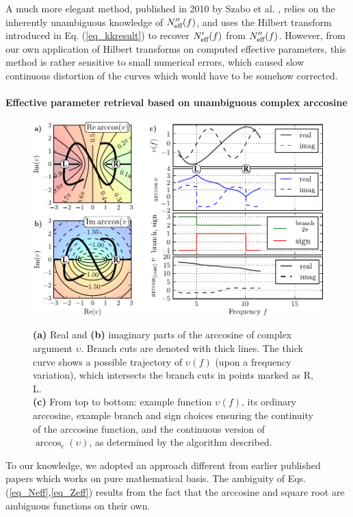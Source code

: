 A much more elegant method, published in 2010 by Szabo et al. \cite{szabo2010unique}, relies on the inherently unambiguous knowledge of $N_{\text{eff} }''(f)$, and uses the Hilbert transform introduced in Eq. (\ref{eq_kkresult}) to recover $N_{\text{eff} }'(f)$ from $N_{\text{eff} }''(f)$. 
However, from our own application of Hilbert transforms on computed effective parameters, this method is rather sensitive to small numerical errors, which caused slow continuous distortion of the curves which would have to be somehow corrected. 


\paragraph{Effective parameter retrieval based on unambiguous complex arccosine}
\begin{figure} \centering \caption{\textbf{(a)} Real and \textbf{(b)} imaginary parts of the arccosine of complex argument $\upsilon$. Branch cuts are denoted with thick lines. The thick curve shows a possible trajectory of  $\upsilon(f)$ (upon a frequency variation), which intersects the branch cuts in points marked as R, L.\\ \textbf{(c)} From top to bottom: example function  $\upsilon(f)$, its ordinary arccosine, example branch and sign choices ensuring the continuity of the arccosine function, and the continuous version of $\arccos_{\mathrm{c}}(\upsilon)$, as determined by the algorithm described.} \includegraphics[width=16cm]{img/continuous_arccos/continuous_arccos_new.pdf} \label{fg_arccos}
\end{figure}

To our knowledge, we adopted an approach different from earlier published papers which works on pure mathematical basis. 
The ambiguity of Eqs. (\ref{eq_Neff},\ref{eq_Zeff}) results from the fact that the arccosine and square root are ambiguous functions \cite{simovski2009material} on their own.

